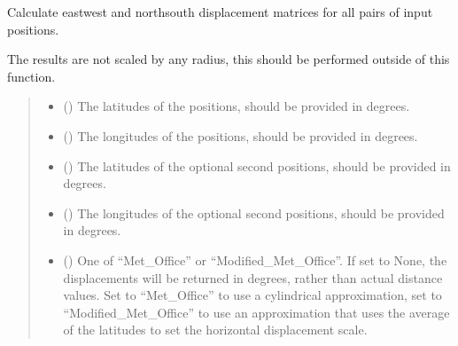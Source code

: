 \documentclass[letterpaper,10pt,english]{sphinxmanual}
\begin{document}

\begin{fulllineitems}
\label{\detokenize{misc:glomar_gridding.distances.displacements}}
\pysigstartsignatures
\pysiglinewithargsret
{}
{\sphinxparamcomma {}\sphinxparamcomma {}\sphinxparamcomma {}\sphinxparamcomma {}}
{}
\pysigstopsignatures
\sphinxAtStartPar
Calculate east\sphinxhyphen{}west and north\sphinxhyphen{}south displacement matrices for all pairs
of input positions.

\sphinxAtStartPar
The results are not scaled by any radius, this should be performed outside
of this function.
\begin{quote}\begin{description}
\begin{itemize}
\item {}
\sphinxAtStartPar
{} () \textendash{} The latitudes of the positions, should be provided in degrees.

\item {}
\sphinxAtStartPar
{} () \textendash{} The longitudes of the positions, should be provided in degrees.

\item {}
\sphinxAtStartPar
{} () \textendash{} The latitudes of the optional second positions, should be provided in
degrees.

\item {}
\sphinxAtStartPar
{} () \textendash{} The longitudes of the optional second positions, should be provided in
degrees.

\item {}
\sphinxAtStartPar
{} (\sphinxstyleliteralemphasis{\sphinxupquote{ | }}) \textendash{} One of “Met\_Office” or “Modified\_Met\_Office”. If set to None, the
displacements will be returned in degrees, rather than actual distance
values. Set to “Met\_Office” to use a cylindrical approximation, set
to “Modified\_Met\_Office” to use an approximation that uses the average
of the latitudes to set the horizontal displacement scale.


\end{itemize}
\end{description}
\end{quote}
\end{fulllineitems}
\end{document}
